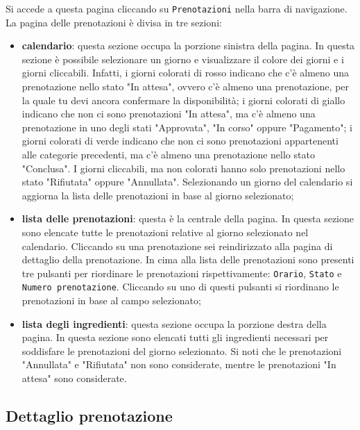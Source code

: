 Si accede a questa pagina cliccando su \texttt{Prenotazioni} nella barra di
navigazione. La pagina delle prenotazioni è divisa in tre sezioni:
\begin{itemize}
	\item \textbf{calendario}: questa sezione occupa la porzione sinistra della
		pagina. In questa sezione è possibile selezionare un giorno e
		visualizzare il colore dei giorni e i giorni cliccabili. Infatti, i
		giorni colorati di rosso indicano che c'è almeno una prenotazione nello
		stato "In attesa", ovvero c'è almeno una prenotazione, per la quale tu
		devi ancora confermare la disponibilità; i giorni colorati di giallo
		indicano che non ci sono prenotazioni "In attesa", ma c'è almeno una
		prenotazione in uno degli stati "Approvata", "In corso" oppure
		"Pagamento"; i giorni colorati di verde indicano che non ci sono
		prenotazioni appartenenti alle categorie precedenti, ma c'è almeno una
		prenotazione nello stato "Conclusa". I giorni cliccabili, ma non
		colorati hanno solo prenotazioni nello stato "Rifiutata" oppure
		"Annullata". Selezionando un giorno del calendario si aggiorna la lista
		delle prenotazioni in base al giorno selezionato;

	\item \textbf{lista delle prenotazioni}: questa è la centrale della pagina.
		In questa sezione sono elencate tutte le prenotazioni relative al giorno
		selezionato nel calendario. Cliccando su una prenotazione sei
		reindirizzato alla pagina di dettaglio della prenotazione. In cima alla
		lista delle prenotazioni sono presenti tre pulsanti per riordinare le
		prenotazioni rispettivamente: \texttt{Orario}, \texttt{Stato} e
		\texttt{Numero prenotazione}. Cliccando su uno di questi pulsanti si
		riordinano le prenotazioni in base al campo selezionato;

	\item \textbf{lista degli ingredienti}: questa sezione occupa la porzione
		destra della pagina. In questa sezione sono elencati tutti gli
		ingredienti necessari per soddisfare le prenotazioni del giorno
		selezionato. Si noti che le prenotazioni "Annullata" e "Rifiutata" non
		sono considerate, mentre le prenotazioni "In attesa" sono considerate.
\end{itemize}

\subsection{Dettaglio prenotazione}


